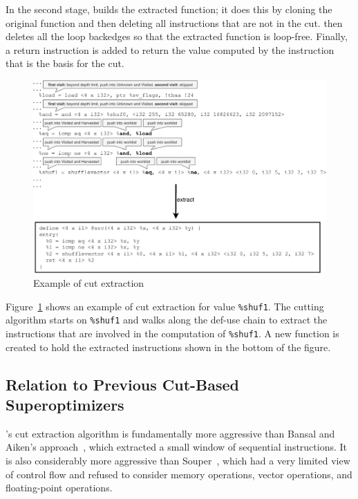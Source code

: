 In the second stage, \minotaur{} builds the extracted function; it does
this by cloning the original function and then deleting all
instructions that are not in the cut.
%
\minotaur{} then deletes all the loop backedges so that the extracted
function is loop-free.
%
Finally, a return instruction is added to return the value computed by
the instruction that is the basis for the cut.

\begin{figure}
  \centering
  \includegraphics[width=\linewidth]{figures/slice.pdf}
  \caption{Example of cut extraction}
  \label{fig:cut}
\end{figure}


Figure~\ref{fig:cut} shows an example of cut extraction
for value \texttt{\%shuf1}.
%
The cutting algorithm starts on \texttt{\%shuf1} and walks along the
def-use chain to extract the instructions that are involved in the
computation of \texttt{\%shuf1}.
%
A new function is created to hold the extracted instructions shown
in the bottom of the figure.



\subsection{Relation to Previous Cut-Based Superoptimizers}

\minotaur's cut extraction algorithm is fundamentally more aggressive
than Bansal and Aiken's approach~\cite{Bansal06}, which extracted a
small window of sequential instructions.
%
It is also considerably more aggressive than Souper~\cite{souper},
which had a very limited view of control flow and refused to consider
memory operations, vector operations, and floating-point operations.